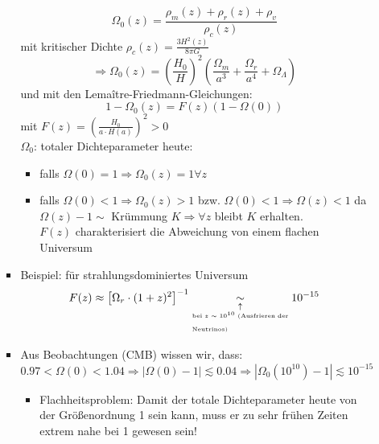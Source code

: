\begin{itemize}
\begin{enumerate}[label={(\arabic*)}]
\begin{itemize}[label={$\to$}]
						\begin{equation*}
							\Omega_0(z)=\frac{\rho_m(z)+\rho_r(z)+\rho_v}{\rho_c(z)}
						\end{equation*}
						mit kritischer Dichte $\rho_c(z)=\frac{3H^2(z)}{8\pi G}$
						\begin{equation*}
							\Rightarrow \Omega_0(z)=\left(\frac{H_0}{H}\right)^2\left(\frac{\Omega_m}{a^3}+\frac{\Omega_r}{a^4}+\Omega_\Lambda\right)
						\end{equation*}
						und mit den Lema\^itre-Friedmann-Gleichungen:
						\begin{equation*}
							1-\Omega_0(z)=F(z)(1-\Omega(0))
						\end{equation*}
						mit $F(z)=\left(\frac{H_0}{a\cdot H(a)}\right)^2 >0$\\
						$\Omega_0$: totaler Dichteparameter heute:
						\begin{itemize}[label={\textbullet}]
							\item falls $\Omega(0)=1 \Rightarrow \Omega_0(z)=1 \forall z$
							\item falls $\Omega(0)<1 \Rightarrow \Omega_0(z)>1$ bzw. $\Omega(0)<1\Rightarrow \Omega(z)<1$ da $\Omega(z)-1\sim $ Krümmung $K\Rightarrow\forall z$ bleibt $K$ erhalten.\\
								$F(z)$ charakterisiert die Abweichung von einem flachen Universum
						\end{itemize}
					\item Beispiel: für strahlungsdominiertes Universum
						\begin{equation*}
							F(z)\approx\left[\Omega_r\cdot(1+z)^2\right]^{-1}\underset{\underset{\begin{minipage}{3cm}\begin{tiny} bei $z\sim 10^{10}$ (Ausfrieren der Neutrinos)\end{tiny}\end{minipage}}{\uparrow}}{\sim} 10^{-15}
						\end{equation*}
					\item Aus Beobachtungen (CMB) wissen wir, dass:
						\begin{equation*}
							\num{0.97}<\Omega(0)<\num{1.04}\Rightarrow \left|\Omega(0)-1\right|\lesssim\num{0.04}\Rightarrow\left|\Omega_0(10^10)-1\right|\lesssim 10^{-15}
						\end{equation*}
						\begin{itemize}[label={$\Rightarrow$}]
							\item Flachheitsproblem: Damit der totale Dichteparameter heute von der Größenordnung 1 sein kann, muss er zu sehr frühen Zeiten extrem nahe bei 1 gewesen sein!

\end{itemize}
\end{itemize}
\end{enumerate}
\end{itemize}
